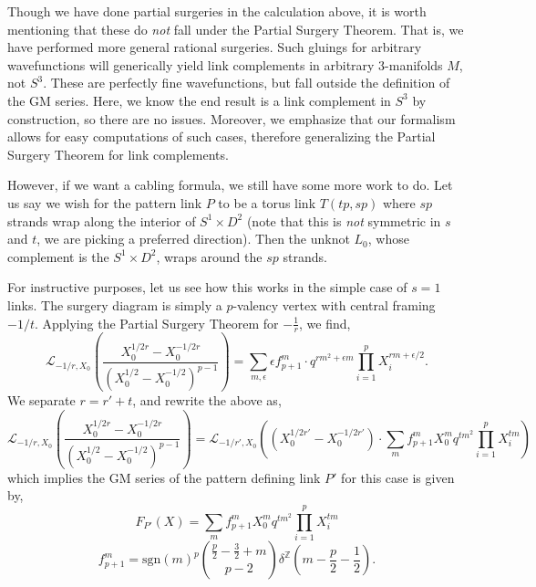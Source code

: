\documentclass{article}
\def\be{\begin{equation}}
\def\ee{\end{equation}}
\numberwithin{corollary}{theorem}
\numberwithin{corollary}{proposition}
\begin{document}
Though we have done partial surgeries in the calculation above, it is worth mentioning that these do \textit{not} fall under the Partial Surgery Theorem. That is, we have performed more general rational surgeries. Such gluings for arbitrary wavefunctions will generically yield link complements in arbitrary 3-manifolds $M$, not $S^3$. These are perfectly fine wavefunctions, but fall outside the definition of the GM series. Here, we know the end result is a link complement in $S^3$ by construction, so there are no issues. Moreover, we emphasize that our formalism allows for easy computations of such cases, therefore generalizing the Partial Surgery Theorem for link complements. 

However, if we want a cabling formula, we still have some more work to do. Let us say we wish for the pattern link $P$ to be a torus link $T(tp,sp)$ where $sp$ strands wrap along the interior of $S^1\times D^2$ (note that this is \textit{not} symmetric in $s$ and $t$, we are picking a preferred direction). Then the unknot $L_0$, whose complement is the $S^1\times D^2$, wraps around the $sp$ strands. 

For instructive purposes, let us see how this works in the simple case of $s=1$ links. The surgery diagram is simply a $p$-valency vertex with central framing $-1/t$. Applying the Partial Surgery Theorem for $-\frac{1}{r}$, we find, 
$$\mathcal{L}_{-1/r,X_0} \left(\frac{X^{1/2r}_0-X^{-1/2r}_0}{(X^{1/2}_0 -X^{-1/2}_0)^{p-1}}\right) = \sum_{m,\epsilon}\epsilon f^m_{p+1} \cdot q^{rm^2+\epsilon m} \prod^p_{i=1}X^{r m +\epsilon/2}_i. $$
We separate $r = r' +t$, and rewrite the above as,
$$\mathcal{L}_{-1/r,X_0} \left(\frac{X^{1/2r}_0-X^{-1/2r}_0}{(X^{1/2}_0 -X^{-1/2}_0)^{p-1}}\right)= \mathcal{L}_{-1/r',X_0}\left( (X^{1/2r'}_0-X^{-1/2r'}_0)\cdot \sum_m f^m_{p+1}X_0^m q^{tm^2}\prod^p_{i=1}X_i^{tm}\right)$$
which implies the GM series of the pattern defining link $P'$ for this case is given by,
\be \label{t,tp case}F_{P'}(X) = \sum_m f^m_{p+1}X_0^m q^{tm^2}\prod^p_{i=1}X_i^{tm}\ee
$$f^m_{p+1} = \mathrm{sgn}(m)^p \binom{\frac{p}{2}-\frac{3}{2}+m}{p-2} \delta^{\mathbb{Z}}\left(m-\frac{p}{2}-\frac{1}{2}\right).$$
\end{document}
